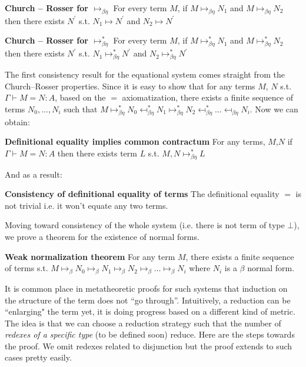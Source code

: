 \begin{mdframed}
	\begin{theorem}	\textbf{Church -- Rosser for $\mapsto_{\beta\eta}$}
		For every term $M$, if $M\mapsto_{\beta\eta} N_1$ and $M \mapsto_{\beta\eta} N_2$ then there exists $N^{'}$ s.t. $N_1 \mapsto N^{'}$ and $N_2\mapsto N^{'}$
		
	\end{theorem}	
	\begin{theorem}	\textbf{Church -- Rosser for $\mapsto_{\beta\eta}^{*}$}
		For every term $M$, if $M\mapsto_{\beta\eta}^{*} N_1$ and $M \mapsto_{\beta\eta}^{*} N_2$ then there exists $N^{'}$ s.t. $N_1 \mapsto_{\beta\eta}^{*} N^{'}$ and $N_2\mapsto_{\beta\eta}^{*} N^{'}$
		
	\end{theorem}	
\end{mdframed}
 The first consistency result for the equational system comes straight from the Church--Rosser properties. 
 Since it is  easy to show that for any terms $M$, $N$ s.t.  $\Gamma\vdash M= N: A$, 
 based on the $=$ axiomatization, there exists a finite sequence of terms $N_0,\ldots, N_i$ such that $M\mapsto_{\beta\eta}^{*}N_0\mapsfrom_{\beta\eta}^{*} N_1\mapsto_{\beta\eta}^{*} N_2\mapsfrom_{\beta\eta}^{*}\ldots \mapsfrom_{\beta\eta} N_i$. Now we can obtain:
 \begin{mdframed}
 \begin{theorem}	\textbf{Definitional equality implies common contractum}
 	For any terms, $M$,$N$ if $\Gamma\vdash M= N:A$ then there exists term $L$ s.t. $M,N\mapsto_{\beta\eta}^{*} L$
 	
 \end{theorem}
\end{mdframed}
 And as a result:
 \begin{mdframed}	
 \begin{theorem}	\textbf{Consistency of definitional equality of terms}
 	The definitional equality $=$ is not trivial i.e. it won't equate any two terms.
 \end{theorem}	
\end{mdframed}
Moving toward consistency of the whole system (i.e. there is not term of type $\bot$), we prove a theorem for the existence of normal forms.
\begin{mdframed}	
\begin{theorem}	\textbf{Weak normalization theorem}
For any term $M$, there exists a finite sequence of terms s.t. $M\mapsto_{\beta}N_0\mapsto_{\beta} N_1\mapsto_{\beta} N_2\mapsto_{\beta}\ldots \mapsto_{\beta} N_i$ where $N_i$ is a $\beta$ normal form.
\end{theorem}	
\end{mdframed}
It is common place in metatheoretic proofs for such systems that induction on the structure of the term does not ``go through''. 
Intuitively, a reduction can be ``enlarging" the term  yet, 
it is doing progress based on a different kind of metric. 
 The idea is that we can choose a reduction strategy 
such that the number of \textit{redexes of a specific type} 
(to be defined soon) reduce. Here are the steps towards the proof. We omit redexes related to disjunction but the proof extends to such cases pretty easily.


